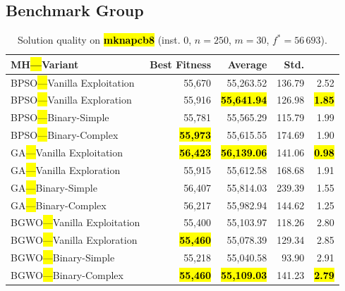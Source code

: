 \documentclass[mathematics,article,accept,moreauthors]{Definitions/mdpi}
\begin{document}
\subsection{Benchmark Group }

\vspace{-9pt}

\begin{table}[H]
  \small
  \caption{Solution quality on \textbf{\hl{mknapcb8}} (inst. 0, $n=250$, $m=30$, $f^*=56\,693$).}
  \label{tab:calidad_mknapcb8_0}
  \begin{tabularx}{\textwidth}{lRRRR}
    \toprule
    \textbf{MH\hl{---}Variant} &
    \textbf{Best Fitness} &
    \textbf{Average} &
    \textbf{Std.} &
    \textbf{} \\
    \midrule
    BPSO\hl{---}Vanilla Exploitation &          55,670 &         55,263.52 & 136.79 &         2.52 \\
    BPSO\hl{---}Vanilla Exploration  &          55,916 & \textbf{\hl{55,641.94}} & 126.98 & \textbf{\hl{1.85}} \\
    BPSO\hl{---}Binary-Simple        &          55,781 &         55,565.29 & 115.79 &         1.99 \\
    BPSO\hl{---}Binary-Complex       & \textbf{\hl{55,973}} &         55,615.55 & 174.69 &         1.90 \\
    \midrule
    GA\hl{---}Vanilla Exploitation   & \textbf{\hl{56,423}} & \textbf{\hl{56,139.06}} & 141.06 & \textbf{\hl{0.98}} \\
    GA\hl{---}Vanilla Exploration    &          55,915 &         55,612.58 & 168.68 &         1.91 \\
    GA\hl{---}Binary-Simple          &          56,407 &         55,814.03 & 239.39 &         1.55 \\
    GA\hl{---}Binary-Complex         &          56,217 &         55,982.94 & 144.62 &         1.25 \\
    \midrule
    BGWO\hl{---}Vanilla Exploitation &          55,400 &         55,103.97 & 118.26 &         2.80 \\
    BGWO\hl{---}Vanilla Exploration  & \textbf{\hl{55,460}} &         55,078.39 & 129.34 &         2.85 \\
    BGWO\hl{---}Binary-Simple        &          55,218 &         55,040.58 &  93.90 &         2.91 \\
    BGWO\hl{---}Binary-Complex       & \textbf{\hl{55,460}} & \textbf{\hl{55,109.03}} & 141.23 & \textbf{\hl{2.79}} \\

\end{tabularx}
\end{table}
\end{document}
